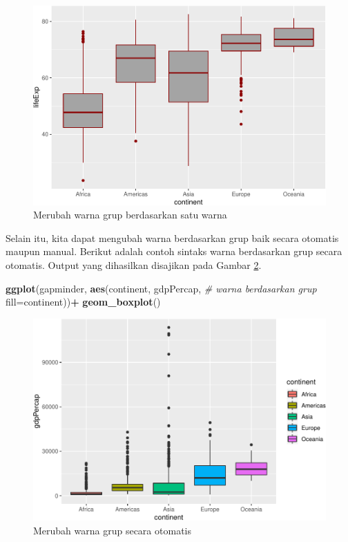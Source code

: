\documentclass[]{book}
\newenvironment{Shaded}{\begin{snugshade}}{\end{snugshade}}
\newcommand{\KeywordTok}[1]{\textcolor[rgb]{0.13,0.29,0.53}{\textbf{#1}}}
\newcommand{\DataTypeTok}[1]{\textcolor[rgb]{0.13,0.29,0.53}{#1}}
\newcommand{\StringTok}[1]{\textcolor[rgb]{0.31,0.60,0.02}{#1}}
\newcommand{\CommentTok}[1]{\textcolor[rgb]{0.56,0.35,0.01}{\textit{#1}}}
\newcommand{\OperatorTok}[1]{\textcolor[rgb]{0.81,0.36,0.00}{\textbf{#1}}}
\newcommand{\NormalTok}[1]{#1}
\begin{document}
\begin{figure}

{\centering \includegraphics[width=0.7\linewidth]{EnvStat_files/figure-latex/ggcolor-1} 

}

\caption{Merubah warna grup berdasarkan satu warna}\label{fig:ggcolor}
\end{figure}

Selain itu, kita dapat mengubah warna berdasarkan grup baik secara
otomatis maupun manual. Berikut adalah contoh sintaks warna berdasarkan
grup secara otomatis. Output yang dihasilkan disajikan pada Gambar
\ref{fig:ggcolor2}.

\begin{Shaded}
\begin{Highlighting}[]
\KeywordTok{ggplot}\NormalTok{(gapminder, }\KeywordTok{aes}\NormalTok{(continent, gdpPercap, }
                      \CommentTok{# warna berdasarkan grup}
                      \DataTypeTok{fill=}\NormalTok{continent))}\OperatorTok{+}
\StringTok{  }\KeywordTok{geom_boxplot}\NormalTok{()}
\end{Highlighting}
\end{Shaded}

\begin{figure}

{\centering \includegraphics[width=0.7\linewidth]{EnvStat_files/figure-latex/ggcolor2-1} 

}

\caption{Merubah warna grup secara otomatis}\label{fig:ggcolor2}
\end{figure}
\end{document}
